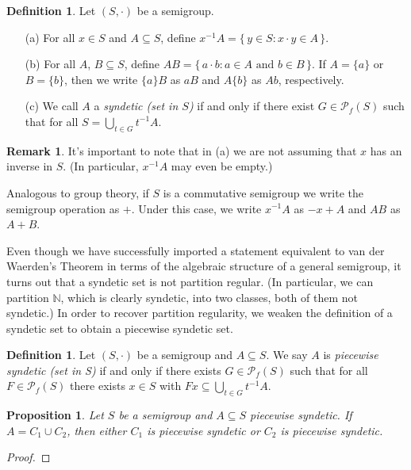 \documentclass[12pt]{article}
\theoremstyle{plain}
\newtheorem{prop}[thm]{Proposition}
\theoremstyle{definition}
\newtheorem{defn}[thm]{Definition}
\newtheorem{rmk}[thm]{Remark}
\newcommand{\bbN}{\mathbb{N}}
\newcommand{\Pf}{\mathcal{P}_f}
\begin{document}
\begin{defn}
  Let $(S, \cdot)$ be a semigroup.
  \begin{itemize}
    \item[(a)] For all $x \in S$ and $A \subseteq S$, define $x^{-1}A = \{\, y
      \in S : x \cdot y \in A \,\}$.
    
    \item[(b)] For all $A$, $B \subseteq S$, define $AB = \{\, a\cdot
      b : \mbox{$a \in A$ and $b \in B$} \,\}$. 
      If $A = \{a\}$ or $B = \{b\}$, then we write $\{a\}B$ as $aB$
      and $A\{b\}$ as $Ab$, respectively. 

    \item[(c)] We call $A$ a \textsl{syndetic (set in $S$)} if and
      only if there exist $G \in \Pf(S)$ such that for all $S =
      \bigcup_{t \in G} t^{-1}A$. 
  \end{itemize}
\end{defn}
\begin{rmk}
  It's important to note that in (a) we are not assuming that $x$ has
  an inverse in $S$.
  (In particular, $x^{-1}A$ may even be empty.)

  Analogous to group theory, if $S$ is a commutative semigroup we
  write the semigroup operation as $+$. 
  Under this case, we write $x^{-1}A$ as $-x + A$ and $AB$ as $A +
  B$. 
\end{rmk}

Even though we have successfully imported a statement equivalent to
van der Waerden's Theorem in terms of the algebraic structure of a
general semigroup, it turns out that a syndetic set is not partition
regular. 
(In particular, we can partition $\bbN$, which is clearly syndetic,
into two classes, both of them not syndetic.)
In order to recover partition regularity, we weaken the definition of
a syndetic set to obtain a piecewise syndetic set.

\begin{defn}
  Let $(S, \cdot)$ be a semigroup and $A \subseteq S$.
  We say $A$ is \textsl{piecewise syndetic (set in S)} if and only if there
  exists $G \in \Pf(S)$ such that for all $F \in \Pf(S)$ there exists
  $x \in S$ with $Fx \subseteq \bigcup_{t \in G} t^{-1}A$.
\end{defn}

\begin{prop}
  Let $S$ be a semigroup and $A \subseteq S$ piecewise syndetic.
  If $A = C_1 \cup C_2$, then either $C_1$ is piecewise syndetic or
  $C_2$ is piecewise syndetic.
\end{prop}
\begin{proof}
  
\end{proof}
\end{document}

